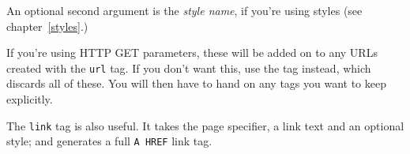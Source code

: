 An optional second argument is the \emph{style name}, if you're using
styles (see chapter~\ref{styles}.)

If you're using HTTP GET parameters, these will be added on to any
URLs created with the \texttt{url} tag. If you don't want this,
use the  tag instead, which discards all of these.
You will then have to hand on any tags you want to keep explicitly.

The \texttt{link} tag is also useful. It takes the page specifier,
a link text and an optional style; and generates a full \texttt{A HREF}
link tag.
